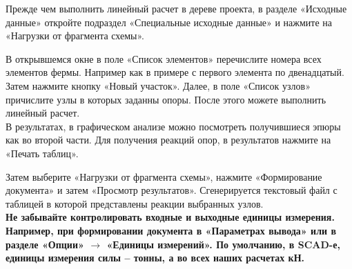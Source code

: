 \documentclass[a4paper,12pt]{article}
\begin{document}
Прежде чем выполнить линейный расчет в дереве проекта, 
в разделе «Исходные данные» откройте подраздел 
«Специальные исходные данные» и  нажмите на 
«Нагрузки от фрагмента схемы».
\begin{figure}[h]
 \center{\texttt{[image: a2]}}
\end{figure}
В открывшемся 
окне в поле «Список элементов» перечислите номера 
всех элементов фермы. Например как в примере с первого 
элемента по двенадцатый. Затем нажмите кнопку «Новый участок». 
Далее, в поле «Список узлов» причислите 
узлы в которых заданны опоры. После этого можете выполнить линейный расчет. \\

В результатах, в графическом анализе можно посмотреть получившиеся 
эпюры как во второй части.  Для получения реакций опор, в результатов 
нажмите на «Печать таблиц».
\begin{figure}[h]
 \center{\texttt{[image: a3]}}
\end{figure}
Затем выберите «Нагрузки от фрагмента схемы», 
нажмите «Формирование документа» и затем «Просмотр результатов». Сгенерируется 
текстовый файл с таблицей в которой представлены реакции выбранных узлов. \\

\bf
Не забывайте контролировать входные и выходные единицы измерения. Например, 
при формировании документа в «Параметрах вывода» или в разделе «Опции» $\to$ «Единицы измерений».
По умолчанию, в SCAD-е, единицы измерения силы – тонны, а во всех наших расчетах кН. 
\end{document}
